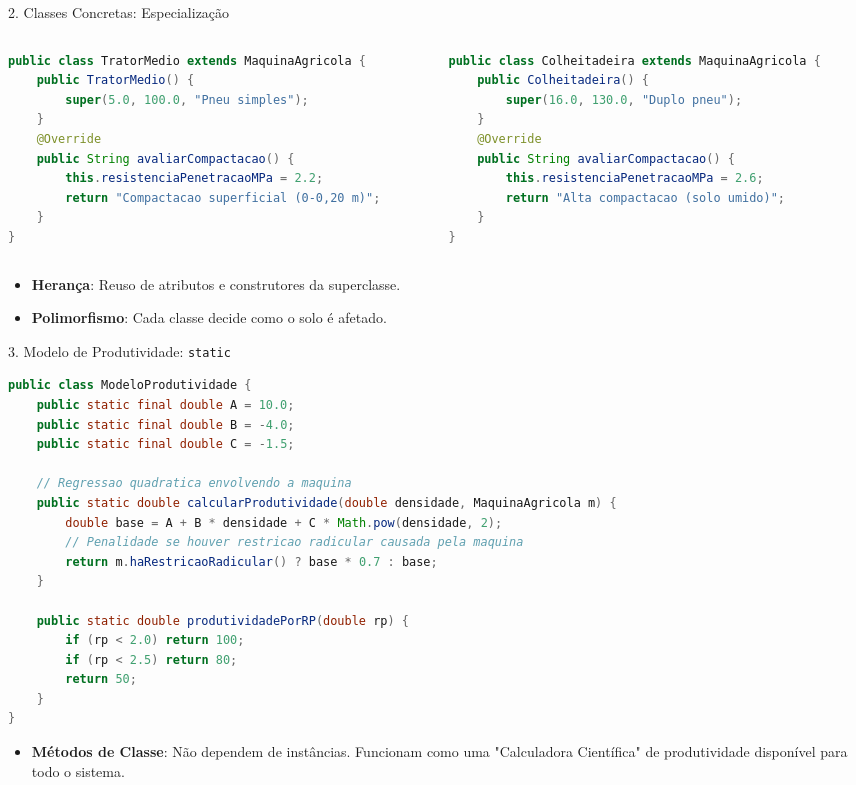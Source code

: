 \documentclass[9pt]{beamer}
\begin{document}
\begin{frame}[fragile]{2. Classes Concretas: Especialização}
\begin{columns}
\begin{column}{0.5\textwidth}
\begin{lstlisting}[language=Java, basicstyle=\tiny, title=TratorMedio.java]
public class TratorMedio extends MaquinaAgricola {
    public TratorMedio() {
        super(5.0, 100.0, "Pneu simples");
    }
    @Override
    public String avaliarCompactacao() {
        this.resistenciaPenetracaoMPa = 2.2;
        return "Compactacao superficial (0-0,20 m)";
    }
}
\end{lstlisting}
\end{column}
\begin{column}{0.5\textwidth}
\begin{lstlisting}[language=Java, basicstyle=\tiny, title=Colheitadeira.java]
public class Colheitadeira extends MaquinaAgricola {
    public Colheitadeira() {
        super(16.0, 130.0, "Duplo pneu");
    }
    @Override
    public String avaliarCompactacao() {
        this.resistenciaPenetracaoMPa = 2.6;
        return "Alta compactacao (solo umido)";
    }
}
\end{lstlisting}
\end{column}
\end{columns}
\begin{itemize}
    \item \textbf{Herança}: Reuso de atributos e construtores da superclasse.
    \item \textbf{Polimorfismo}: Cada classe decide como o solo é afetado.
\end{itemize}
\end{frame}

\begin{frame}[fragile]{3. Modelo de Produtividade: \texttt{static}}
\begin{lstlisting}[language=Java, basicstyle=\tiny]
public class ModeloProdutividade {
    public static final double A = 10.0;
    public static final double B = -4.0;
    public static final double C = -1.5;

    // Regressao quadratica envolvendo a maquina
    public static double calcularProdutividade(double densidade, MaquinaAgricola m) {
        double base = A + B * densidade + C * Math.pow(densidade, 2);
        // Penalidade se houver restricao radicular causada pela maquina
        return m.haRestricaoRadicular() ? base * 0.7 : base;
    }

    public static double produtividadePorRP(double rp) {
        if (rp < 2.0) return 100;
        if (rp < 2.5) return 80;
        return 50;
    }
}
\end{lstlisting}
\begin{itemize}
    \item \textbf{Métodos de Classe}: Não dependem de instâncias. Funcionam como uma "Calculadora Científica" de produtividade disponível para todo o sistema.
\end{itemize}
\end{frame}
\end{document}
